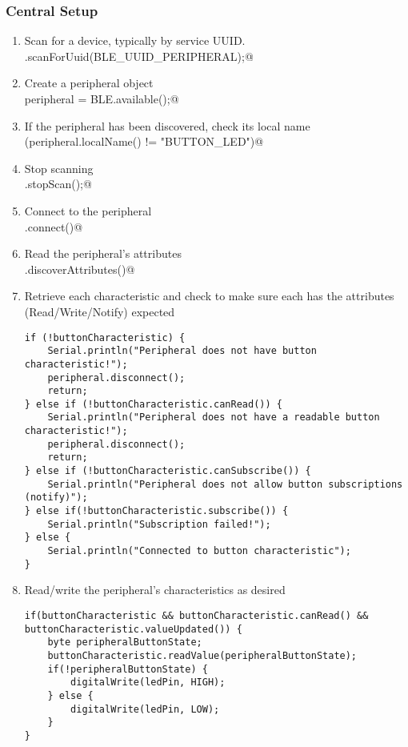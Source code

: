 \subsubsection{Central Setup}
\begin{enumerate}
    \item Scan for a device, typically by service UUID. \\
        \lstinline@BLE.scanForUuid(BLE_UUID_PERIPHERAL);@ 
    \item Create a peripheral object \\
        \lstinline@BLEDevice peripheral = BLE.available();@ 
    \item If the peripheral has been discovered, check its local name  \\
        \lstinline@if (peripheral.localName() != "BUTTON_LED")@ 
    \item Stop scanning \\
        \lstinline@BLE.stopScan();@ 
    \item Connect to the peripheral \\
        \lstinline@peripheral.connect()@ 
    \item Read the peripheral's attributes \\
        \lstinline@peripheral.discoverAttributes()@ 
    \item Retrieve each characteristic and check to make sure each has the 
            attributes (Read/Write/Notify) expected
        \begin{lstlisting}
if (!buttonCharacteristic) {
    Serial.println("Peripheral does not have button characteristic!");
    peripheral.disconnect();
    return;
} else if (!buttonCharacteristic.canRead()) {
    Serial.println("Peripheral does not have a readable button characteristic!");
    peripheral.disconnect();
    return;
} else if (!buttonCharacteristic.canSubscribe()) {
    Serial.println("Peripheral does not allow button subscriptions (notify)");
} else if(!buttonCharacteristic.subscribe()) {
    Serial.println("Subscription failed!");
} else {
    Serial.println("Connected to button characteristic");
}
        \end{lstlisting}
    \item Read/write the peripheral's characteristics as desired
        \begin{lstlisting}
if(buttonCharacteristic && buttonCharacteristic.canRead() && buttonCharacteristic.valueUpdated()) {
    byte peripheralButtonState;
    buttonCharacteristic.readValue(peripheralButtonState);
    if(!peripheralButtonState) {
        digitalWrite(ledPin, HIGH);
    } else {
        digitalWrite(ledPin, LOW);
    }
}          
        \end{lstlisting}
\end{enumerate}

